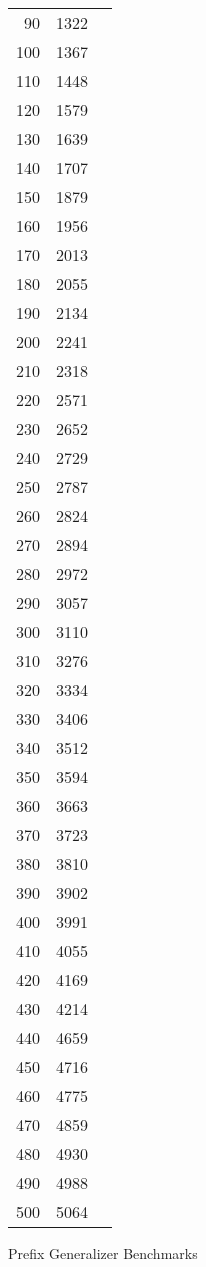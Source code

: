 \begin{figure}[H]
\begin{tabular}{r r r}
        90 & 1322 \\
        100 & 1367 \\
        110 & 1448 \\
        120 & 1579 \\
        130 & 1639 \\
        140 & 1707 \\
        150 & 1879 \\
        160 & 1956 \\
        170 & 2013 \\
        180 & 2055 \\
        190 & 2134 \\
        200 & 2241 \\
        210 & 2318 \\
        220 & 2571 \\
        230 & 2652 \\
        240 & 2729 \\
        250 & 2787 \\
        260 & 2824 \\
        270 & 2894 \\
        280 & 2972 \\
        290 & 3057 \\
        300 & 3110 \\
        310 & 3276 \\
        320 & 3334 \\
        330 & 3406 \\
        340 & 3512 \\
        350 & 3594 \\
        360 & 3663 \\
        370 & 3723 \\
        380 & 3810 \\
        390 & 3902 \\
        400 & 3991 \\
        410 & 4055 \\
        420 & 4169 \\
        430 & 4214 \\
        440 & 4659 \\
        450 & 4716 \\
        460 & 4775 \\
        470 & 4859 \\
        480 & 4930 \\
        490 & 4988 \\
        500 & 5064 \\
        \bottomrule
    \end{tabular}
    \caption{Prefix Generalizer Benchmarks}
\end{figure}